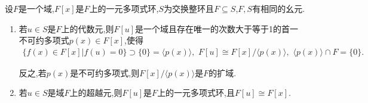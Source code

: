 \documentclass[../../main.tex]{subfiles}%
\begin{document}
\begin{theorem}\label{theorem:多项式环的同构}
设$F$是一个域,$F[x]$是$F$上的一元多项式环,$S$为交换整环且$F \subseteq S$,$F,S$有相同的幺元.
\begin{enumerate}[(1)]
\item\label{theorem:多项式环的同构-1} 若$u \in S$是$F$上的代数元,则$F[u]$是一个域且存在唯一的次数大于等于1的首一不可约多项式$p(x) \in F[x]$,使得
\begin{align*}
\{f(x) \in F[x]|f(u) = 0\} \supset \{0\}=\langle p(x) \rangle,\,\,F[u] \cong F[x]/\langle p(x) \rangle,\,\,\langle p(x) \rangle \cap F = \{0\}.
\end{align*}

反之,若$p(x)$是不可约多项式,则$F[x]/\langle p(x) \rangle$是$F$的扩域.

\item\label{theorem:多项式环的同构-2} 若$u \in S$是域$F$上的超越元,则$F[u]$是$F$上的一元多项式环,且$F[u] \cong F[x]$.
\end{enumerate}
\end{theorem}
\end{document}
